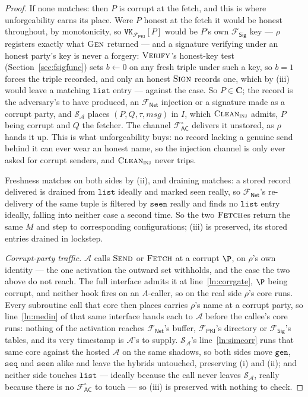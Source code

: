 \documentclass[10pt,oneside,openany]{book}
\newcommand{\Cs}{\mathbf{C}}
\newcommand{\Adv}{\mathcal{A}}
\newcommand{\Sim}{\mathcal{S}}
\newcommand{\op}[1]{\textnormal{\textsc{#1}}}
\newcommand{\Fsig}{\mathcal{F}_{\mathsf{Sig}}}
\newcommand{\Fnet}{\mathcal{F}_{\mathsf{Net}}}
\newcommand{\Facz}{\mathcal{F}^{\circ}_{\mathsf{AC}}}
\newcommand{\Fpki}{\mathcal{F}_{\mathsf{PKI}}}
\newcommand{\msg}{\mathit{msg}}
\newcommand{\Clean}{\op{Clean}}
\newcommand{\V}[1]{\mathtt{#1}}
\theoremstyle{accentdef}
\theoremstyle{accentplain}
\begin{document}
\begin{proof}
If none matches: then $P$ is corrupt at the fetch, and this is where unforgeability earns its
place. Were $P$ honest at the fetch it would be honest throughout, by monotonicity, so
$\V{VK}_{\Fpki}[P]$ would be $P$'s own $\Fsig$ key --- $\rho$ registers exactly what $\op{Gen}$
returned --- and a signature verifying under an honest party's key is never a forgery:
$\op{Verify}$'s honest-key test (Section~\ref{sec:fsigfunc}) sets $b \gets 0$ on any fresh triple
under such a key, so $b = 1$ forces the triple recorded, and only an honest $\op{Sign}$ records
one, which by (iii) would leave a matching $\V{list}$ entry --- against the case. So $P \in \Cs$;
the record is the adversary's to have produced, an $\Fnet$ injection or a signature made as a
corrupt party, and $\Sim_{\Adv}$ places $(P,Q,\tau,\msg)$ in $I$, which $\Clean_{\op{inj}}$ admits,
$P$ being corrupt and $Q$ the fetcher. The channel $\Facz$ delivers it unstored, as $\rho$ hands it up. This
is what unforgeability buys: no record lacking a genuine send behind it can ever wear an honest
name, so the injection channel is only ever asked for corrupt senders, and $\Clean_{\op{inj}}$
never trips.

Freshness matches on both sides by (ii), and draining matches: a stored record delivered is
drained from $\V{list}$ ideally and marked seen really, so $\Fnet$'s re-delivery of the same tuple
is filtered by $\V{seen}$ really and finds no $\V{list}$ entry ideally, falling into neither case a
second time. So the two $\op{Fetch}$es return the same $M$ and step to corresponding
configurations; (iii) is preserved, its stored entries drained in lockstep.

\emph{Corrupt-party traffic.} $\Adv$ calls $\op{Send}$ or $\op{Fetch}$ at a corrupt $\P$, on
$\rho$'s own identity --- the one activation the outward set withholds, and the case the two
above do not reach. The full interface admits it at line~\ref{ln:corrgate}, $\P$ being corrupt,
and neither hook fires on an $A$-caller, so on the real side $\rho$'s core runs. Every subroutine
call that core then places carries $\rho$'s name at a corrupt party, so line~\ref{ln:medin} of
that same interface hands each to $\Adv$ before the callee's core runs: nothing of the activation
reaches $\Fnet$'s buffer, $\Fpki$'s directory or $\Fsig$'s tables, and its very timestamp is
$\Adv$'s to supply. $\Sim_{\Adv}$'s line~\ref{ln:simcorr}
runs that same core against the hosted $\Adv$ on the same shadows, so both sides move $\V{gen}$,
$\V{seq}$ and $\V{seen}$ alike and leave the hybrids untouched, preserving (i) and (ii); and
neither side touches $\V{list}$ --- ideally because the call never leaves $\Sim_{\Adv}$, really
because there is no $\Facz$ to touch --- so (iii) is preserved with nothing to check.


\end{proof}
\end{document}
